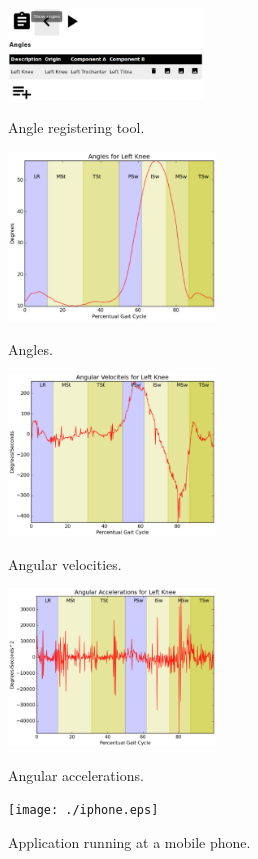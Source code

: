 \documentclass[journal]{IEEEtran}
\begin{document}
\begin{figure}[!t]
	\centering
	{\includegraphics[width=0.46\textwidth]{./angles_tool.eps}}
	\caption{Angle registering tool.}
	\label{angles_tool}
\end{figure}
\begin{figure}[!t]
	\centering
	{\includegraphics[width=0.49\textwidth]{./angles.eps}}
	\caption{Angles.}
	\label{angles}
\end{figure}
\begin{figure}[!t]
	\centering
	{\includegraphics[width=0.49\textwidth]{./av.eps}}
	\caption{Angular velocities.}
	\label{av}
\end{figure}
\begin{figure}[!t]
	\centering
	{\includegraphics[width=0.49\textwidth]{./aa.eps}}
	\caption{Angular accelerations.}
	\label{aa}
\end{figure}
\begin{figure}[!t]
	\centering
	{\texttt{[image: ./iphone.eps]}}
	\caption{Application running at a mobile phone.}
	\label{iphone}
\end{figure}
\end{document}
